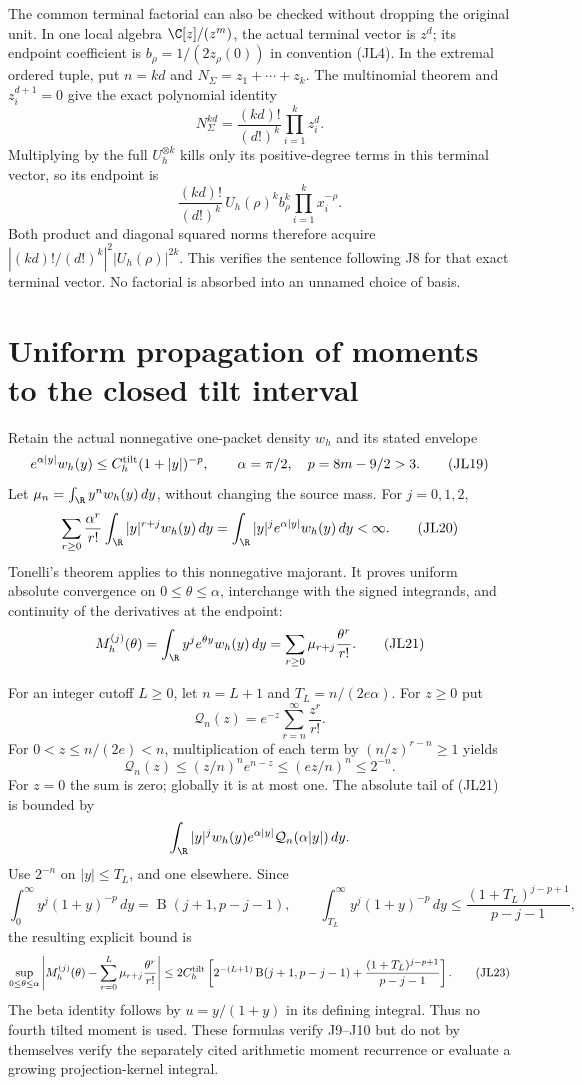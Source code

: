 \documentclass[11pt,a4paper]{article}
\begin{document}
The common terminal factorial can also be checked without dropping the
original unit.  In one local algebra \(\C[z]/(z^m)\), the actual terminal
vector is \(z^d\); its endpoint coefficient is
\(b_\rho=1/(2z_\rho(0))\) in convention (JL4).
In the extremal ordered tuple, put \(n=kd\) and
\(N_\Sigma=z_1+\cdots+z_k\).  The multinomial theorem and \(z_i^{d+1}=0\)
give the exact polynomial identity
\[
N_\Sigma^{kd}=\frac{(kd)!}{(d!)^k}\prod_{i=1}^k z_i^d.
\tag{JL17}
\]
Multiplying by the full \(U_h^{\otimes k}\) kills only its positive-degree
terms in this terminal vector, so its endpoint is
\[
\frac{(kd)!}{(d!)^k}\,U_h(\rho)^k b_\rho^k
\prod_{i=1}^k x_i^{-\rho}.
\tag{JL18}
\]
Both product and diagonal squared norms therefore acquire
\(\left|(kd)!/(d!)^k\right|^2|U_h(\rho)|^{2k}\).
This verifies the sentence following J8 for that exact terminal vector.
No factorial is absorbed into an unnamed choice of basis.

\section{Uniform propagation of moments to the closed tilt interval}

Retain the actual nonnegative one-packet density \(w_h\) and its stated
envelope
\[
e^{\alpha|y|}w_h(y)\le C_h^{\rm tilt}(1+|y|)^{-p},
\qquad \alpha=\pi/2,\quad p=8m-9/2>3.
\tag{JL19}
\]
Let \(\mu_n=\int_\R y^nw_h(y)\,dy\), without changing the source mass.
For \(j=0,1,2\),
\[
\sum_{r\ge0}\frac{\alpha^r}{r!}
\int_\R |y|^{r+j}w_h(y)\,dy
=\int_\R |y|^je^{\alpha|y|}w_h(y)\,dy<\infty.
\tag{JL20}
\]
Tonelli's theorem applies to this nonnegative majorant.  It proves
uniform absolute convergence on \(0\le\theta\le\alpha\), interchange
with the signed integrands, and continuity of the derivatives at
the endpoint:
\[
M_h^{(j)}(\theta)
=\int_\R y^je^{\theta y}w_h(y)\,dy
=\sum_{r\ge0}\mu_{r+j}\frac{\theta^r}{r!}.
\tag{JL21}
\]

For an integer cutoff \(L\ge0\), let \(n=L+1\) and
\(T_L=n/(2e\alpha)\).  For \(z\ge0\) put
\[
\mathcal Q_n(z)=e^{-z}\sum_{r=n}^{\infty}\frac{z^r}{r!}.
\]
For \(0<z\le n/(2e)<n\), multiplication of each term by
\((n/z)^{r-n}\ge1\) yields
\[
\mathcal Q_n(z)
\le (z/n)^n e^{n-z}
\le(ez/n)^n\le2^{-n}.
\tag{JL22}
\]
For \(z=0\) the sum is zero; globally it is at most one.
The absolute tail of (JL21) is bounded by
\[
\int_\R |y|^jw_h(y)e^{\alpha|y|}
\mathcal Q_n(\alpha|y|)\,dy.
\]
Use \(2^{-n}\) on \(|y|\le T_L\), and one elsewhere.
Since
\[
\int_0^\infty y^j(1+y)^{-p}\,dy
=\operatorname B(j+1,p-j-1),\qquad
\int_{T_L}^\infty y^j(1+y)^{-p}\,dy
\le\frac{(1+T_L)^{j-p+1}}{p-j-1},
\]
the resulting explicit bound is
\[
\sup_{0\le\theta\le\alpha}
\left|M_h^{(j)}(\theta)
-\sum_{r=0}^{L}\mu_{r+j}\frac{\theta^r}{r!}\right|
\le2C_h^{\rm tilt}\left[
2^{-(L+1)}\operatorname B(j+1,p-j-1)
+\frac{(1+T_L)^{j-p+1}}{p-j-1}\right].
\tag{JL23}
\]
The beta identity follows by \(u=y/(1+y)\) in its defining integral.
Thus no fourth tilted moment is used.  These formulas verify J9--J10
but do not by themselves verify the separately cited arithmetic
moment recurrence or evaluate a growing projection-kernel integral.
\end{document}
